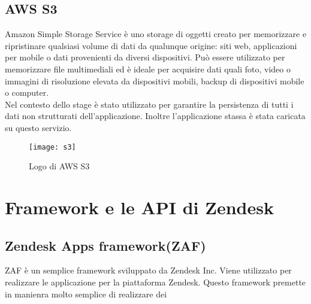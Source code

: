 \subsection{AWS S3} 
Amazon Simple Storage Service è uno storage di
oggetti creato per memorizzare e ripristinare qualsiasi volume di dati da qualunque
origine: siti web, applicazioni per mobile o dati provenienti da diversi dispositivi. Può
essere utilizzato per memorizzare file multimediali ed è ideale per acquisire dati quali
foto, video o immagini di risoluzione elevata da dispositivi mobili, backup di dispositivi
mobile o computer.
\\

Nel contesto dello stage è stato utilizzato per garantire la persistenza di tutti i dati
non strutturati dell’applicazione. Inoltre l'applicazione stassa è stata caricata su questo servizio.   
\begin{figure}[!h] 
	\centering 
	\texttt{[image: s3]}
	\caption{Logo di AWS S3}
\end{figure}
\section{Framework e le API di Zendesk}

\subsection{Zendesk Apps framework(ZAF)}
ZAF è un semplice framework sviluppato da Zendesk Inc. Viene utilizzato per realizzare le applicazione per la piattaforma Zendesk. Questo framework premette in manienra molto semplice di realizzare dei


